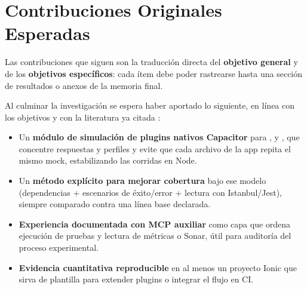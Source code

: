 \section{Contribuciones Originales Esperadas}
\label{chap:contribuciones}

Las contribuciones que siguen son la traducción directa del \textbf{objetivo general} y de los \textbf{objetivos específicos}: cada ítem debe poder rastrearse hasta una sección de resultados o anexos de la memoria final.

Al culminar la investigación se espera haber aportado lo siguiente, en línea con los objetivos y con la literatura ya citada \cite{nie2023gui_mobile_mapping,schafer2024testpilot,olsthoorn2024syntest_javascript,mcp-spec2025}:

\begin{itemize}
    \item Un \textbf{módulo de simulación de plugins nativos Capacitor} para ,  y , que concentre respuestas y perfiles y evite que cada archivo de la app repita el mismo mock, estabilizando las corridas en Node.
    \item Un \textbf{método explícito para mejorar cobertura} bajo ese modelo (dependencias + escenarios de éxito/error + lectura con Istanbul/Jest), siempre comparado contra una línea base declarada.
    \item \textbf{Experiencia documentada con MCP auxiliar} como capa que ordena ejecución de pruebas y lectura de métricas o Sonar, útil para auditoría del proceso experimental.
    \item \textbf{Evidencia cuantitativa reproducible} en al menos un proyecto Ionic que sirva de plantilla para extender plugins o integrar el flujo en CI.
\end{itemize}
